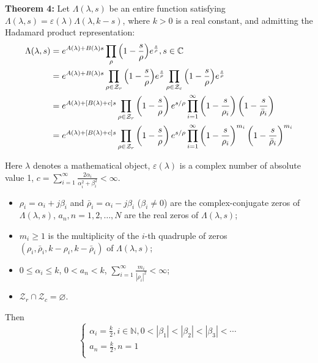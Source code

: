 \documentclass[12pt]{article}
\begin{document}
\textbf{Theorem 4:} Let $\Lambda(\lambda, s)$ be an entire function satisfying $\Lambda(\lambda, s)=\varepsilon(\lambda)\Lambda(\lambda, k-s)$,
where $k >0 $ is a real constant, and admitting the
Hadamard product representation:
\begin{equation}\begin{split}
\Lambda(\lambda, s)
&=e^{A(\lambda)+B(\lambda)s}\prod_{\rho}\Big{(}1-\frac{s}{\rho}\Big{)}e^{\frac{s}{\rho}}, s \in\mathbb{C}\\
&=e^{A(\lambda)+B(\lambda)s}\prod_{\rho \in \mathcal{Z}_{r}}\Big{(}1-\frac{s}{\rho}\Big{)}e^{\frac{s}{\rho}}\prod_{\rho \in \mathcal{Z}_{c}}\Big{(}1-\frac{s}{\rho}\Big{)}e^{\frac{s}{\rho}}\\
&=e^{A(\lambda)+[B(\lambda)+c]s}\prod_{\rho \in \mathcal{Z}_r}\left(1-\frac{s}{\rho}\right)e^{s/\rho} \prod_{i=1}^{\infty}\left(1-\frac{s}{\rho_i}\right)\left(1-\frac{s}{\bar{\rho}_i}\right)\\
&=e^{A(\lambda)+[B(\lambda)+c]s}\prod_{\rho \in \mathcal{Z}_r}\left(1-\frac{s}{\rho}\right)e^{s/\rho} \prod_{i=1}^{\infty}\left(1-\frac{s}{\rho_i}\right)^{m_i}\left(1-\frac{s}{\bar{\rho}_i}\right)^{m_i}
\end{split}\end{equation}

 Here $\lambda$ denotes a mathematical object, $\varepsilon(\lambda)$ is a complex number of absolute value 1, $c=\sum_{i=1}^{\infty}\frac{2\alpha_i}{\alpha_i^2+\beta_i^2}<\infty$.
\begin{itemize}
\item $\rho_i=\alpha_i+j\beta_i$ and $\bar\rho_i=\alpha_i-j\beta_i$ ($\beta_i \neq 0$)
      are the complex-conjugate zeros of $\Lambda(\lambda, s)$, $a_n, n=1,2,\ldots,N$ are the real zeros of $\Lambda(\lambda, s)$;
\item $m_i \geq 1$ is the multiplicity of the $i$-th quadruple of zeros $(\rho_i, \bar\rho_i, k-\rho_i, k-\bar\rho_i)$ of $\Lambda(\lambda, s)$;
\item $0 \leq \alpha_i \leq k$, $0 < a_n < k$, $\sum_{i=1}^{\infty}\frac{m_i}{|\rho_i|^2}<\infty$;
\item $\mathcal{Z}_{r} \cap \mathcal{Z}_{c} = \varnothing.$
\end{itemize}

Then
\begin{equation}
\begin{cases}\alpha_i=\frac{k}{2}, i\in\mathbb{N}, 0<|\beta_1|<|\beta_2|<|\beta_3|<\cdots\\ a_n=\frac{k}{2}, n=1\\
\end{cases}\end{equation}
\end{document}

